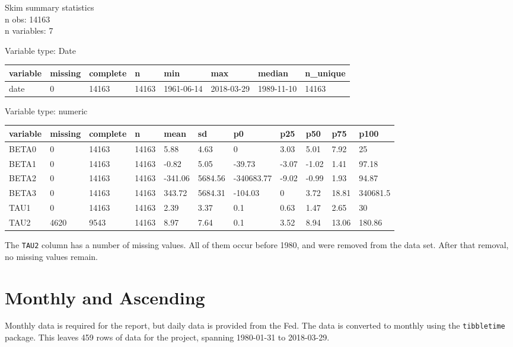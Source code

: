 \documentclass[openany]{book}
\theoremstyle{definition}
\theoremstyle{definition}
\theoremstyle{definition}
\theoremstyle{remark}
\begin{document}
Skim summary statistics\\
n obs: 14163\\
n variables: 7

Variable type: Date

\begin{tabular}{llllllll}
\toprule
variable & missing & complete & n & min & max & median & n\_unique\\
\midrule
date & 0 & 14163 & 14163 & 1961-06-14 & 2018-03-29 & 1989-11-10 & 14163\\
\bottomrule
\end{tabular}

Variable type: numeric

\begin{tabular}{lllllllllll}
\toprule
variable & missing & complete & n & mean & sd & p0 & p25 & p50 & p75 & p100\\
\midrule
BETA0 & 0 & 14163 & 14163 & 5.88 & 4.63 & 0 & 3.03 & 5.01 & 7.92 & 25\\
BETA1 & 0 & 14163 & 14163 & -0.82 & 5.05 & -39.73 & -3.07 & -1.02 & 1.41 & 97.18\\
BETA2 & 0 & 14163 & 14163 & -341.06 & 5684.56 & -340683.77 & -9.02 & -0.99 & 1.93 & 94.87\\
BETA3 & 0 & 14163 & 14163 & 343.72 & 5684.31 & -104.03 & 0 & 3.72 & 18.81 & 340681.5\\
TAU1 & 0 & 14163 & 14163 & 2.39 & 3.37 & 0.1 & 0.63 & 1.47 & 2.65 & 30\\
TAU2 & 4620 & 9543 & 14163 & 8.97 & 7.64 & 0.1 & 3.52 & 8.94 & 13.06 & 180.86\\
\bottomrule
\end{tabular}

\normalsize

The \texttt{TAU2} column has a number of missing values. All of them
occur before 1980, and were removed from the data set. After that
removal, no missing values remain.

\hypertarget{monthly}{%
\section{Monthly and Ascending}\label{monthly}}

\small

\normalsize

Monthly data is required for the report, but daily data is provided from
the Fed. The data is converted to monthly using the \texttt{tibbletime}
package. This leaves 459 rows of data for the project, spanning
1980-01-31 to 2018-03-29.
\end{document}
